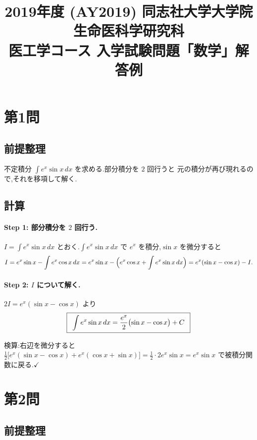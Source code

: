 \documentclass[11pt,a4paper]{article}
\title{2019年度 (AY2019) 同志社大学大学院 生命医科学研究科\\
医工学コース 入学試験問題「数学」解答例}
\author{}
\date{}
\begin{document}
\maketitle
\vspace{-3em}

\section*{第1問}

\subsection*{前提整理}

不定積分 $\displaystyle\int e^x\sin x\,dx$ を求める.部分積分を $2$ 回行うと
元の積分が再び現れるので,それを移項して解く.

\subsection*{計算}

\paragraph{Step 1: 部分積分を $2$ 回行う.}
$I=\displaystyle\int e^x\sin x\,dx$ とおく.$\int e^x\sin x\,dx$ で $e^x$ を積分,$\sin x$ を微分すると
\[
I=e^x\sin x-\int e^x\cos x\,dx
=e^x\sin x-\Bigl(e^x\cos x+\int e^x\sin x\,dx\Bigr)
=e^x(\sin x-\cos x)-I.
\]

\paragraph{Step 2: $I$ について解く.}
$2I=e^x(\sin x-\cos x)$ より
\[
\ans{\
\int e^x\sin x\,dx=\frac{e^x}{2}\bigl(\sin x-\cos x\bigr)+C\ }
\]

検算:右辺を微分すると
$\frac12\bigl[e^x(\sin x-\cos x)+e^x(\cos x+\sin x)\bigr]=\frac12\cdot2e^x\sin x=e^x\sin x$
で被積分関数に戻る.$\checkmark$

\section*{第2問}

\subsection*{前提整理}
\end{document}
